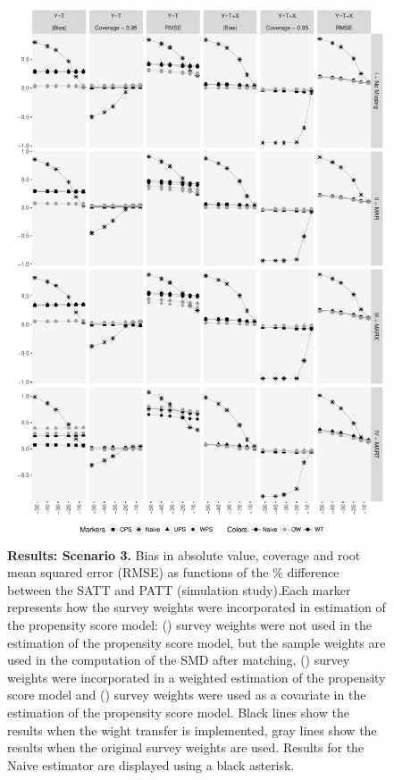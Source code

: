 \documentclass[oupdraft]{bio}
\newcommand{\mysquare}[1]{\tikz{\node[draw=#1,fill=#1,rectangle,minimum
width=0.18cm,minimum height=0.18cm,inner sep=0pt] at (0,0) {};}}
\newcommand{\mycircle}[1]{\tikz{\node[draw=#1,fill=#1,circle,minimum
width=0.2cm,minimum height=0.2cm,inner sep=0pt] at (0,0) {};}}
\newcommand{\mytriangle}[1]{\tikz{\node[draw=#1,fill=#1,isosceles
triangle,isosceles triangle stretches,shape border rotate=90,minimum
width=0.2cm,minimum height=0.2cm,inner sep=0pt] at (0,0) {};}}
\begin{document}
\begin{figure}[t]
\centering\includegraphics[scale=0.63]{Scenario3_v2.pdf}
\caption{{\small{}\textbf{Results: Scenario 3.} Bias in absolute value, coverage and root mean squared error (RMSE) as functions
of the \% difference between the SATT and PATT (simulation study).Each marker represents how the survey weights were incorporated in estimation of the propensity score model: (\mytriangle{black}) survey weights were not used in the estimation of the propensity score model, but the sample weights are used in the computation of the SMD after matching, (\mycircle{black}) survey weights were incorporated in a weighted estimation of the propensity score model and (\mysquare{black})  survey weights were used as a covariate in the estimation of the propensity score model. Black lines  show the results when the wight transfer is implemented, gray lines show the results when the original survey weights are used. Results for the Naive estimator are displayed using a black asterisk.}}
\label{Scenario3} 
\end{figure}



\end{document}
